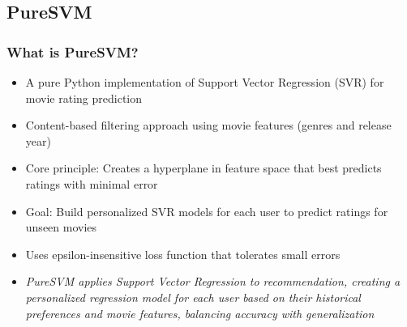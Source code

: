 \documentclass{beamer}
\begin{document}
\subsection{PureSVM}
\begin{frame}
\frametitle{What is PureSVM?}

\begin{itemize}
    \item A pure Python implementation of Support Vector Regression (SVR) for movie rating prediction
    \item Content-based filtering approach using movie features (genres and release year)
    \item Core principle: Creates a hyperplane in feature space that best predicts ratings with minimal error
    \item Goal: Build personalized SVR models for each user to predict ratings for unseen movies
    \item Uses epsilon-insensitive loss function that tolerates small errors
    
    \vspace{1cm}

    \item \textit{PureSVM applies Support Vector Regression to recommendation, creating a personalized regression model for each user based on their historical preferences and movie features, balancing accuracy with generalization}
\end{itemize}
\end{frame}
\end{document}
